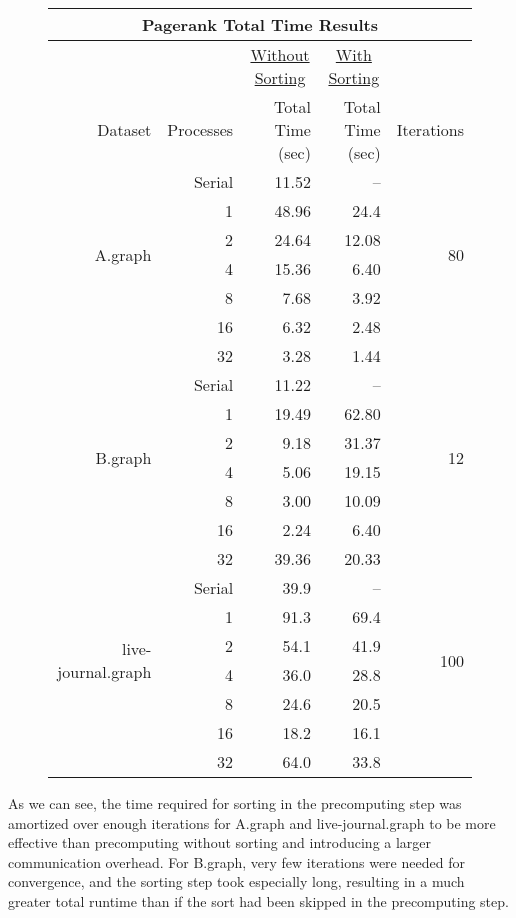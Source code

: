 \documentclass[a4paper]{article}
\begin{document}
\begin{figure}[h]
  \begin{tabular}{| r | r | r | r | r |}
    \hline
    \multicolumn{5}{|c|}{Pagerank Total Time Results} \\
    \hline
    & & \multicolumn{1}{|c|}{\underline{Without Sorting}} & \multicolumn{1}{|c|}{\underline{With Sorting}} & \\
    Dataset & Processes & \multicolumn{1}{|r|}{Total Time (sec)} & \multicolumn{1}{|r|}{Total Time (sec)}
    & Iterations\\
    \hline
    \multirow{6}{4em}{A.graph} & Serial & 11.52 & -- & \multirow{6}{4em}{80} \\
    & 1 & 48.96 & 24.4 & \\
    & 2 & 24.64 & 12.08 & \\
    & 4 & 15.36 & 6.40 & \\
    & 8 & 7.68 & 3.92 & \\
    & 16 & 6.32 & 2.48 & \\
    & 32 & 3.28 & 1.44 & \\
    \hline
    \multirow{6}{4em}{B.graph} & Serial & 11.22 & -- & \multirow{6}{4em}{12}\\
    & 1 & 19.49 & 62.80 & \\
    & 2 & 9.18 & 31.37 & \\
    & 4 & 5.06 & 19.15 & \\
    & 8 & 3.00 & 10.09 & \\
    & 16 & 2.24 & 6.40 & \\
    & 32 & 39.36 & 20.33 & \\
    \hline
    \multirow{6}{8em}{live-journal.graph} & Serial & 39.9 & -- & \multirow{6}{4em}{100} \\
    & 1 & 91.3 & 69.4 & \\
    & 2 & 54.1 & 41.9 & \\
    & 4 & 36.0 & 28.8 & \\
    & 8 & 24.6 & 20.5 & \\
    & 16 & 18.2 & 16.1 & \\
    & 32 & 64.0 & 33.8 & \\
    \hline
  \end{tabular}
\end{figure}

As we can see, the time required for sorting in the precomputing step was amortized over enough iterations for A.graph and live-journal.graph to be
more effective than precomputing without sorting and introducing a larger communication overhead. For B.graph, very few iterations were needed for
convergence, and the sorting step took especially long, resulting in a much greater total runtime than if the sort had been skipped in the
precomputing step.
\end{document}
